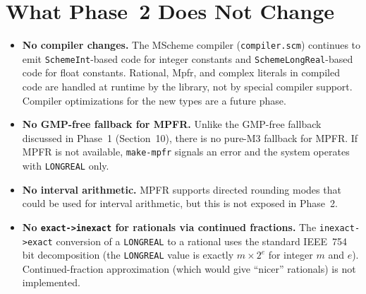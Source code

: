 \documentclass[12pt]{article}
\begin{document}
\section{What Phase~2 Does Not Change}
\label{sec:not-changed}

\begin{itemize}
\item \textbf{No compiler changes.}  The MScheme compiler
  ({\tt compiler.scm}) continues to emit {\tt SchemeInt}-based
  code for integer constants and {\tt SchemeLongReal}-based code
  for float constants.  Rational, Mpfr, and complex literals in
  compiled code are handled at runtime by the library, not by
  special compiler support.  Compiler optimizations for the new
  types are a future phase.

\item \textbf{No GMP-free fallback for MPFR.}  Unlike the GMP-free
  fallback discussed in Phase~1 (Section~10), there is no pure-M3
  fallback for MPFR.  If MPFR is not available, {\tt make-mpfr}
  signals an error and the system operates with {\tt LONGREAL}
  only.

\item \textbf{No interval arithmetic.}  MPFR supports directed
  rounding modes that could be used for interval arithmetic, but
  this is not exposed in Phase~2.

\item \textbf{No {\tt exact->inexact} for rationals via continued
  fractions.}  The {\tt inexact->exact} conversion of a
  {\tt LONGREAL} to a rational uses the standard IEEE~754 bit
  decomposition (the {\tt LONGREAL} value is exactly
  $m \times 2^e$ for integer $m$ and $e$).  Continued-fraction
  approximation (which would give ``nicer'' rationals) is not
  implemented.
\end{itemize}
\end{document}
